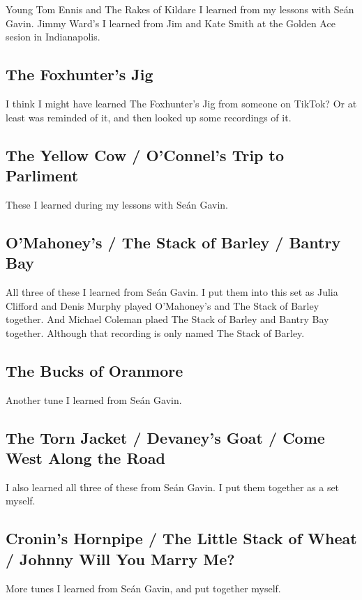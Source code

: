 \documentclass[9pt,letterpaper]{article}
\begin{document}
{Young Tom Ennis and The Rakes of Kildare I learned from my lessons with Se\'an Gavin. Jimmy Ward's I learned from Jim and Kate Smith at the Golden Ace sesion in Indianapolis.

\subsection{The Foxhunter's Jig}

I think I might have learned The Foxhunter's Jig from someone on TikTok? Or at least was reminded of it, and then looked up some recordings of it.

\subsection{The Yellow Cow / O'Connel's Trip to Parliment}

These I learned during my lessons with Se\'an Gavin.

\subsection{O'Mahoney's / The Stack of Barley / Bantry Bay}

All three of these I learned from Se\'an Gavin. I put them into this set as Julia Clifford and Denis Murphy played O'Mahoney's and The Stack of Barley together. And Michael Coleman plaed The Stack of Barley and Bantry Bay together. Although that recording is only named The Stack of Barley.

\subsection{The Bucks of Oranmore}

Another tune I learned from Se\'an Gavin.

\subsection{The Torn Jacket / Devaney's Goat / Come West Along the Road}

I also learned all three of these from Se\'an Gavin. I put them together as a set myself.

\subsection{Cronin's Hornpipe / The Little Stack of Wheat / Johnny Will You Marry Me?}

More tunes I learned from Se\'an Gavin, and put together myself.

}
\end{document}
